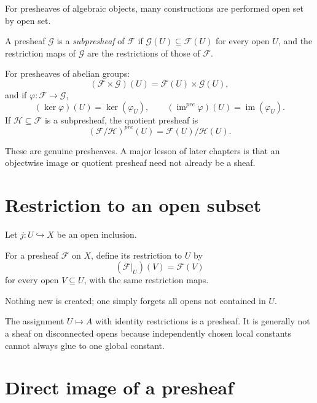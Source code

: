 For presheaves of algebraic objects, many constructions are performed open set by open set.

\begin{definition}[Subpresheaf]
A presheaf $\mathcal G$ is a \emph{subpresheaf} of $\mathcal F$ if
$\mathcal G(U)\subseteq\mathcal F(U)$ for every open $U$, and the restriction maps of
$\mathcal G$ are the restrictions of those of $\mathcal F$.
\end{definition}

For presheaves of abelian groups:
\[
(\mathcal F\times\mathcal G)(U)=\mathcal F(U)\times\mathcal G(U),
\]
and if $\varphi:\mathcal F\to\mathcal G$,
\[
(\ker\varphi)(U)=\ker(\varphi_U),\qquad
(\operatorname{im}^{pre}\varphi)(U)=\operatorname{im}(\varphi_U).
\]
If $\mathcal H\subseteq\mathcal F$ is a subpresheaf, the quotient presheaf is
\[
(\mathcal F/\mathcal H)^{pre}(U)=\mathcal F(U)/\mathcal H(U).
\]

These are genuine presheaves.  A major lesson of later chapters is that an objectwise image
or quotient presheaf need not already be a sheaf.

\section{Restriction to an open subset}

Let $j:U\hookrightarrow X$ be an open inclusion.

\begin{definition}
For a presheaf $\mathcal F$ on $X$, define its restriction to $U$ by
\[
(\mathcal F|_U)(V)=\mathcal F(V)
\]
for every open $V\subseteq U$, with the same restriction maps.
\end{definition}

Nothing new is created; one simply forgets all opens not contained in $U$.

\begin{example}\label{ex:vi12-expand-02}
The assignment $U\mapsto A$ with identity restrictions is a presheaf.  It is generally not a sheaf on disconnected opens because independently chosen local constants cannot always glue to one global constant.
\end{example}
\section{Direct image of a presheaf}

